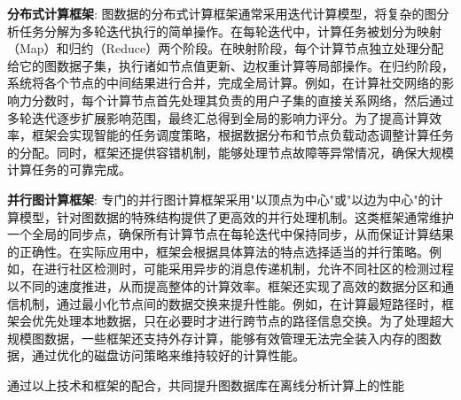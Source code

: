 \textbf{分布式计算框架}: 图数据的分布式计算框架通常采用迭代计算模型，将复杂的图分析任务分解为多轮迭代执行的简单操作。在每轮迭代中，计算任务被划分为映射（Map）和归约（Reduce）两个阶段。在映射阶段，每个计算节点独立处理分配给它的图数据子集，执行诸如节点值更新、边权重计算等局部操作。在归约阶段，系统将各个节点的中间结果进行合并，完成全局计算。例如，在计算社交网络的影响力分数时，每个计算节点首先处理其负责的用户子集的直接关系网络，然后通过多轮迭代逐步扩展影响范围，最终汇总得到全局的影响力评分。为了提高计算效率，框架会实现智能的任务调度策略，根据数据分布和节点负载动态调整计算任务的分配。同时，框架还提供容错机制，能够处理节点故障等异常情况，确保大规模计算任务的可靠完成。

\textbf{并行图计算框架}: 专门的并行图计算框架采用"以顶点为中心"或"以边为中心"的计算模型，针对图数据的特殊结构提供了更高效的并行处理机制。这类框架通常维护一个全局的同步点，确保所有计算节点在每轮迭代中保持同步，从而保证计算结果的正确性。在实际应用中，框架会根据具体算法的特点选择适当的并行策略。例如，在进行社区检测时，可能采用异步的消息传递机制，允许不同社区的检测过程以不同的速度推进，从而提高整体的计算效率。框架还实现了高效的数据分区和通信机制，通过最小化节点间的数据交换来提升性能。例如，在计算最短路径时，框架会优先处理本地数据，只在必要时才进行跨节点的路径信息交换。为了处理超大规模图数据，一些框架还支持外存计算，能够有效管理无法完全装入内存的图数据，通过优化的磁盘访问策略来维持较好的计算性能。

通过以上技术和框架的配合，共同提升图数据库在离线分析计算上的性能